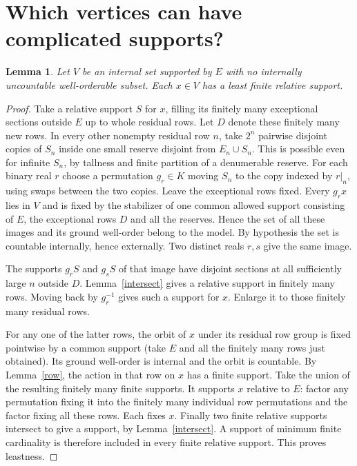 \documentclass[11pt]{article}
\newtheorem{lemma}[theorem]{Lemma}
\begin{document}
\section{Which vertices can have complicated supports?}
\begin{lemma}\label{finite}
Let $V$ be an internal set supported by $E$ with no internally uncountable well-orderable subset. Each $x\in V$ has a least finite relative support.
\end{lemma}
\begin{proof}
Take a relative support $S$ for $x$, filling its finitely many exceptional sections outside $E$ up to whole residual rows. Let $D$ denote these finitely many new rows. In every other nonempty residual row $n$, take $2^n$ pairwise disjoint copies of $S_n$ inside one small reserve disjoint from $E_n\cup S_n$. This is possible even for infinite $S_n$, by tallness and finite partition of a denumerable reserve. For each binary real $r$ choose a permutation $g_r\in K$ moving $S_n$ to the copy indexed by $r|_n$, using swaps between the two copies. Leave the exceptional rows fixed. Every $g_rx$ lies in $V$ and is fixed by the stabilizer of one common allowed support consisting of $E$, the exceptional rows $D$ and all the reserves. Hence the set of all these images and its ground well-order belong to the model. By hypothesis the set is countable internally, hence externally. Two distinct reals $r,s$ give the same image.

The supports $g_rS$ and $g_sS$ of that image have disjoint sections at all sufficiently large $n$ outside $D$. Lemma~\ref{intersect} gives a relative support in finitely many rows. Moving back by $g_r^{-1}$ gives such a support for $x$. Enlarge it to those finitely many residual rows.

For any one of the latter rows, the orbit of $x$ under its residual row group is fixed pointwise by a common support (take $E$ and all the finitely many rows just obtained). Its ground well-order is internal and the orbit is countable. By Lemma~\ref{row}, the action in that row on $x$ has a finite support. Take the union of the resulting finitely many finite supports. It supports $x$ relative to $E$: factor any permutation fixing it into the finitely many individual row permutations and the factor fixing all these rows. Each fixes $x$. Finally two finite relative supports intersect to give a support, by Lemma~\ref{intersect}. A support of minimum finite cardinality is therefore included in every finite relative support. This proves leastness.
\end{proof}
\end{document}
